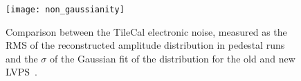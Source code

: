 \begin{figure}[!h]
  \centering
    \texttt{[image: non\_gaussianity]}
    \caption{Comparison between the TileCal electronic noise, measured as the
      RMS of the reconstructed amplitude distribution in pedestal runs and the
      $\sigma$ of the Gaussian fit of the distribution for the old and new
      LVPS~\cite{TileCalNoisePub}.}
    \label{fig:non_gaussianity}
\end{figure}

